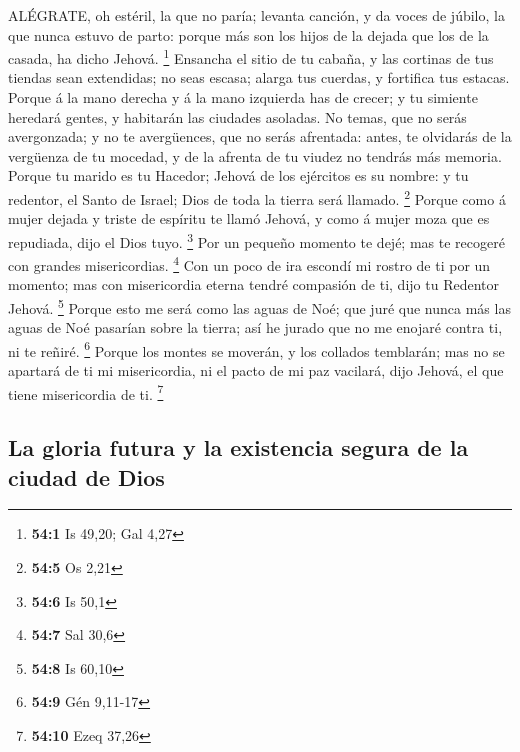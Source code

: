  ALÉGRATE, oh estéril, la que no paría; levanta canción, y
da voces de júbilo, la que nunca estuvo de parto: porque más son los
hijos de la dejada que los de la casada, ha dicho Jehová. \footnote{\textbf{54:1}
  Is 49,20; Gal 4,27}  Ensancha el sitio de tu cabaña, y las
cortinas de tus tiendas sean extendidas; no seas escasa; alarga tus
cuerdas, y fortifica tus estacas.  Porque á la mano derecha
y á la mano izquierda has de crecer; y tu simiente heredará gentes, y
habitarán las ciudades asoladas.  No temas, que no serás
avergonzada; y no te avergüences, que no serás afrentada: antes, te
olvidarás de la vergüenza de tu mocedad, y de la afrenta de tu viudez no
tendrás más memoria.  Porque tu marido es tu Hacedor; Jehová
de los ejércitos es su nombre: y tu redentor, el Santo de Israel; Dios
de toda la tierra será llamado. \footnote{\textbf{54:5} Os 2,21}
 Porque como á mujer dejada y triste de espíritu te llamó
Jehová, y como á mujer moza que es repudiada, dijo el Dios tuyo.
\footnote{\textbf{54:6} Is 50,1}  Por un pequeño momento te
dejé; mas te recogeré con grandes misericordias. \footnote{\textbf{54:7}
  Sal 30,6}  Con un poco de ira escondí mi rostro de ti por
un momento; mas con misericordia eterna tendré compasión de ti, dijo tu
Redentor Jehová. \footnote{\textbf{54:8} Is 60,10}  Porque
esto me será como las aguas de Noé; que juré que nunca más las aguas de
Noé pasarían sobre la tierra; así he jurado que no me enojaré contra ti,
ni te reñiré. \footnote{\textbf{54:9} Gén 9,11-17}  Porque
los montes se moverán, y los collados temblarán; mas no se apartará de
ti mi misericordia, ni el pacto de mi paz vacilará, dijo Jehová, el que
tiene misericordia de ti. \footnote{\textbf{54:10} Ezeq 37,26}

\hypertarget{la-gloria-futura-y-la-existencia-segura-de-la-ciudad-de-dios}{%
\subsection{La gloria futura y la existencia segura de la ciudad de
Dios}\label{la-gloria-futura-y-la-existencia-segura-de-la-ciudad-de-dios}}

